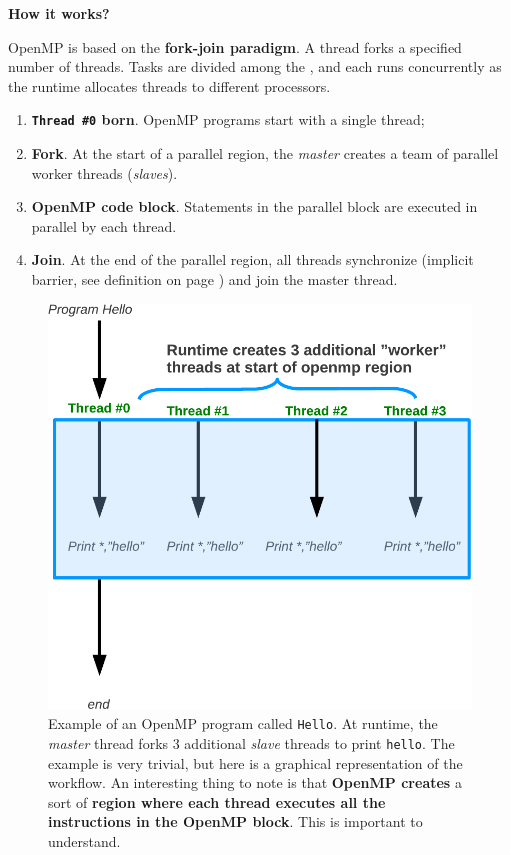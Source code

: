 \begin{flushleft}
    \textcolor{Green3}{ \textbf{How it works?}}
\end{flushleft}
OpenMP is based on the \textbf{fork-join paradigm}. A  thread forks a specified number of  threads. Tasks are divided among the , and each  runs concurrently as the runtime allocates threads to different processors.
\begin{enumerate}
    \item \textbf{\texttt{Thread \#0} born}. OpenMP programs start with a single thread;
    \item \textbf{Fork}. At the start of a parallel region, the \emph{master} creates a team of parallel worker threads (\emph{slaves}).
    \item \textbf{OpenMP code block}. Statements in the parallel block are executed in parallel by each thread.
    \item \textbf{Join}. At the end of the parallel region, all threads synchronize (implicit barrier, see definition on page \pageref{paragraph: Joining through Barriers}) and join the master thread.\cite{whatIsOpenMPumassJohnstonHans}
\end{enumerate}

\newpage

\begin{figure}[!htp]
    \centering
    \includegraphics[width=.7\textwidth]{img/openmp-1.pdf}
    \caption{Example of an OpenMP program called \texttt{Hello}. At runtime, the \emph{master} thread forks 3 additional \emph{slave} threads to print \texttt{hello}. The example is very trivial, but here is a graphical representation of the workflow. An interesting thing to note is that \textbf{OpenMP creates} a sort of \textbf{region where each thread executes all the instructions in the OpenMP block}. This is important to understand.\cite{whatIsOpenMPumassJohnstonHans}}
    \label{figure: how OpenMP works}
\end{figure}